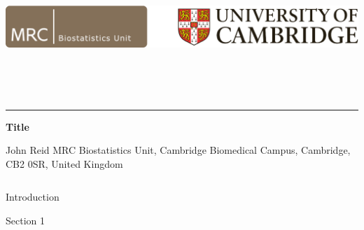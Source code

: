 \documentclass[t, final, 32pt]{beamer}
\begin{document}
\begin{frame}{}

%
\begin{block}{}
  \includegraphics[height=150pt]{MRC_Biostatistics_Cambridge}

  \vspace{1.5cm}
  \textcolor{lightgray}{\noindent\rule{\linewidth}{1pt}}
  \vspace{0.5cm}

  \fontsize{82pt}{82pt}\selectfont \textcolor{mrcblue}{\textbf{Title}}
  \vspace{24pt}

  \fontsize{36pt}{36pt}\selectfont
  \textcolor{mrcblue}{
    John Reid
    \hspace{30pt}
    MRC Biostatistics Unit,
    Cambridge Biomedical Campus,
    Cambridge, CB2 0SR,
    United Kingdom}
\end{block}


%


\begin{center}
\begin{columns}[t]
\begin{column}{.3\linewidth}

\begin{block}{Introduction}
  \blindtext
\end{block}
\vfill

\begin{block}{Section 1}
  \blinditemize
\end{block}

\end{column}


\begin{column}{.36\linewidth}


\end{column}
\end{columns}
\end{center}
\end{frame}
\end{document}
